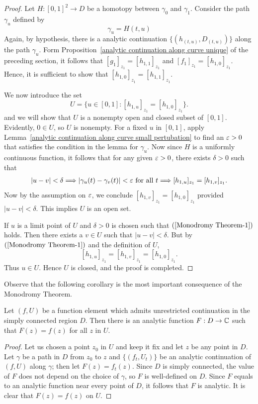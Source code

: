\begin{proof}
Let $H:[0,1]^2\to D$ be a homotopy between $\gamma_0$ and $\gamma_1$. Consider the path $\gamma_u$ defined by
\[\gamma_u=H(t,u)\]
Again, by hypothesis, there is a analytic continuation $\{(h_{(t,u)},D_{(t, u)})\}$ along the path $\gamma_u$. Form Proposition~\ref{analytic continuation along curve unique} of the preceding section, it follows that $[g_1]_{z_1}=[h_{1,1}]_{z_1}$ and $[f_1]_{z_1}=[h_{1,0}]_{z_1}$. Hence, it is sufficient to show that $[h_{1,0}]_{z_1}=[h_{1,1}]_{z_1}$.\par
We now introduce the set
\[U=\{u\in[0,1]:[h_{1,u}]_{z_1}=[h_{1,0}]_{z_1}\}.\]
and we will show that $U$ is a nonempty open and closed subset of $[0,1]$. Evidently, $0\in U$, so $U$ is nonempty. For a fixed $u$ in $[0,1]$, apply Lemma~\ref{analytic continuation along curve small pertubation} to find an $\varepsilon>0$ that satisfies the condition in the lemma for $\gamma_u$. Now since $H$ is a uniformly continuous function, it follows that for any given $\varepsilon>0$, there exists $\delta>0$ such that
\begin{align}\label{Monodromy Theorem-1}
|u-v|<\delta\Longrightarrow|\gamma_u(t)-\gamma_v(t)|<\varepsilon\text{ for all $t$}\Longrightarrow[h_{1,u}]_{z_1}=[h_{1,v}]_{z_1}.
\end{align}
Now by the assumption on $\varepsilon$, we conclude $[h_{1,v}]_{z_1}=[h_{1,0}]_{z_1}$ provided $|u-v|<\delta$. This implies $U$ is an open set.\par
If $u$ is a limit point of $U$ and $\delta>0$ is chosen such that $(\ref{Monodromy Theorem-1})$ holds. Then there exists a $v\in U$ such that $|u-v|<\delta$. But by $(\ref{Monodromy Theorem-1})$ and the definition of $U$,
\[[h_{1,u}]_{z_1}=[h_{1,v}]_{z_1}=[h_{1,0}]_{z_1}.\]
Thus $u\in U$. Hence $U$ is closed, and the proof is completed.
\end{proof}
Observe that the following corollary is the most important consequence of the Monodromy Theorem.
\begin{corollary}
Let $(f,U)$ be a function element which admits unrestricted continuation in the simply connected region $D$. Then there is an analytic function $F:D\to\mathbb{C}$ such that $F(z)=f(z)$ for all $z$ in $U$.
\end{corollary}
\begin{proof}
Let us chosen a point $z_0$ in $U$ and keep it fix and let $z$ be any point in $D$. Let $\gamma$ be a path in $D$ from $z_0$ to $z$ and $\{(f_t,U_t)\}$ be an analytic continuation of $(f,U)$ along $\gamma$; then let $F(z)=f_t(z)$. Since $D$ is simply connected, the value of $F$ does not depend on the choice of $\gamma$, so $F$ is well-defined on $D$. Since $F$ equals to an analytic function near every point of $D$, it follows that $F$ is analytic. It is clear that $F(z)=f(z)$ on $U$.
\end{proof}